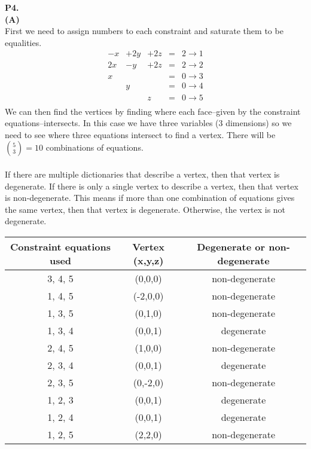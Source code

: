 \documentclass[11pt]{article}
\begin{document}
\noindent\textbf{P4.}
\\
\noindent\textbf{(A)}
\\
First we need to assign numbers to each constraint and saturate them to be equalities.
\[\begin{array}{ccccc}
 -x & + 2 y & + 2z & = & 2 \rightarrow 1\\
2 x & - y & + 2z & = & 2 \rightarrow 2\\
x & & & = & 0 \rightarrow 3\\
& y& & = & 0 \rightarrow 4 \\
& & z & = & 0 \rightarrow 5\\
\end{array}\]
We can then find the vertices by finding where each face--given by the constraint equations--intersects.  In this case we have three variables (3 dimensions) so we need to see where three equations intersect to find a vertex.  There will be ${5 \choose 3} = 10$ combinations of equations.\\
\\
If there are multiple dictionaries that describe a vertex, then that vertex is degenerate.  If there is only a single vertex to describe a vertex, then that vertex is non-degenerate.  This means if more than one combination of equations gives the same vertex, then that vertex is degenerate.  Otherwise, the vertex is not degenerate. 
\begin{center}
\begin{tabular}{|c|c|c|}
\hline
Constraint equations used & Vertex (x,y,z) & Degenerate or non-degenerate \\ \hline
3, 4, 5 & (0,0,0) & non-degenerate \\ \hline
1, 4, 5 & (-2,0,0) & non-degenerate \\ \hline
1, 3, 5 & (0,1,0) & non-degenerate \\ \hline
1, 3, 4 & (0,0,1) & degenerate \\ \hline
2, 4, 5 & (1,0,0) & non-degenerate\\ \hline
2, 3, 4 & (0,0,1) & degenerate \\ \hline
2, 3, 5 & (0,-2,0) & non-degenerate \\ \hline
1, 2, 3 & (0,0,1) & degenerate \\ \hline
1, 2, 4 & (0,0,1) & degenerate \\ \hline
1, 2, 5 & (2,2,0) & non-degenerate \\ \hline
\end{tabular}
\end{center}
\end{document}
